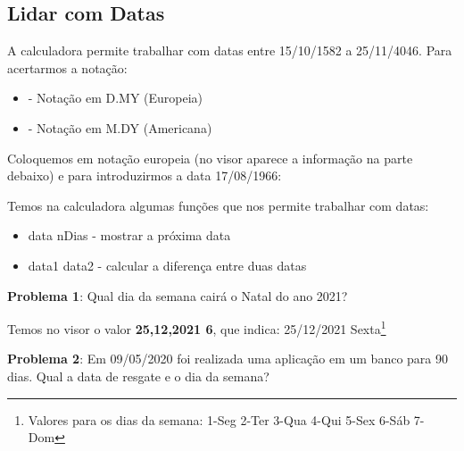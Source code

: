 \subsection*{Lidar com Datas}
A calculadora permite trabalhar com datas entre 15/10/1582 a 25/11/4046. Para acertarmos a notação: \vspace{-1em}
\begin{itemize}
	\item {}  - Notação em D.MY (Europeia)
	\item {}  - Notação em M.DY (Americana)
\end{itemize}

Coloquemos em notação europeia (no visor aparece a informação na parte debaixo) e para introduzirmos a data 17/08/1966:         

Temos na calculadora algumas funções que nos permite trabalhar com datas: \vspace{-1em}
\begin{itemize}
	\item data  nDias   - mostrar a próxima data
	\item data1  data2    - calcular a diferença entre duas datas
\end{itemize}	

\textbf{Problema 1}: Qual dia da semana cairá o Natal do ano 2021?

            

Temos no visor o valor \textbf{25,12,2021 6}, que indica: 25/12/2021 Sexta\footnote{Valores para os dias da semana: 1-Seg 2-Ter 3-Qua 4-Qui 5-Sex 6-Sáb 7-Dom}

\textbf{Problema 2}: Em 09/05/2020 foi realizada uma aplicação em um banco para 90 dias. Qual a data de resgate e o dia da semana?

             

